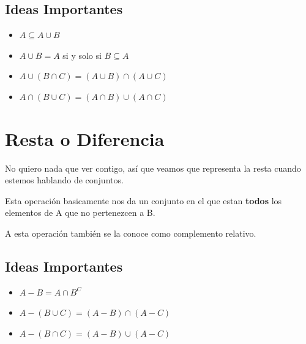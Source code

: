\documentclass[12pt, fleqn]{report}                             %
\theoremstyle{break}                                            %
\begin{document}
            \subsection{Ideas Importantes}

                \begin{itemize}
                    \item $A \subseteq A \cup B$

                    \item $A \cup B = A$ si y solo si $B \subseteq A$

                    \item $A \cup (B \cap C) = (A \cup B) \cap (A \cup C)$

                    \item $A \cap (B \cup C) = (A \cap B) \cup (A \cap C)$
                \end{itemize}




        \clearpage
        \section{Resta o Diferencia}

            No quiero nada que ver contigo, así que veamos que representa la resta cuando estemos
            hablando de conjuntos.
            \begin{equation*}
            \end{equation*}

            Esta operación basicamente nos da un conjunto en el que estan \textbf{todos} los elementos
            de A que no pertenezcen a B.

            A esta operación también se la conoce como complemento relativo.

            \subsection{Ideas Importantes}

                \begin{itemize}
                    \item $A - B = A \cap B^C$

                    \item $A - (B \cup C) = (A - B) \cap (A - C)$

                    \item $A - (B \cap C) = (A - B) \cup (A - C)$

                \end{itemize}
\end{document}

